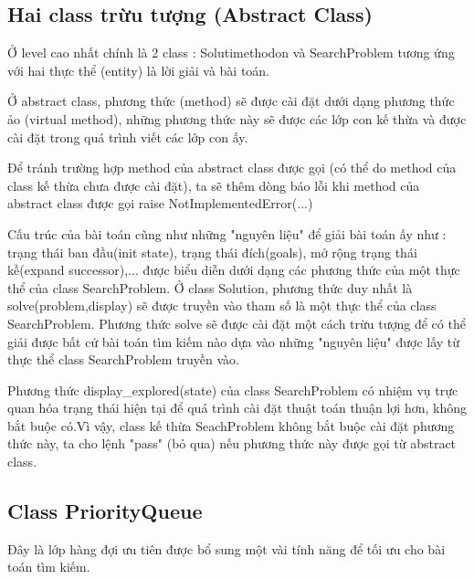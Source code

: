 \documentclass[11pt]{scrartcl} %
\begin{document}
\subsection{Hai class trừu tượng (Abstract Class)}
Ở level cao nhất chính là 2 class : Solutimethodon và SearchProblem tương ứng với hai thực thể (entity) là lời giải và bài toán.

Ở abstract class, phương thức (method) sẽ được cài đặt dưới dạng phương thức ảo (virtual method), những phương thức này sẽ được các lớp con kế thừa và được cài đặt trong quá trình viết các lớp con ấy.

Để tránh trường hợp method của abstract class được gọi (có thể do method của class kế thừa chưa được cài đặt), ta sẽ thêm dòng báo lỗi khi method của abstract class được gọi raise NotImplementedError(...)



Cấu trúc của bài toán cũng như những "nguyên liệu" để giải bài toán ấy như : trạng thái ban đầu(init state), trạng thái đích(goals), mở rộng trạng thái kề(expand successor)\cite{csttnt_lhb},... được biểu diễn dưới dạng các phương thức của một thực thể của class SearchProblem. Ở class Solution, phương thức duy nhất là solve(problem,display) sẽ được truyền vào tham số là một thực thể của class SearchProblem. Phương thức solve sẽ được cài đặt một cách trừu tượng để có thể giải được bất cứ bài toán tìm kiếm nào dựa vào những "nguyên liệu" được lấy từ thực thể class SearchProblem truyền vào.

Phương thức display\_explored(state) của class SearchProblem có nhiệm vụ trực quan hóa trạng thái hiện tại để quá trình cài đặt thuật toán thuận lợi hơn, không bắt buộc có.Vì vậy, class kế thừa SeachProblem không bắt buộc cài đặt phương thức này, ta cho lệnh "pass" (bỏ qua) nếu phương thức này được gọi từ abstract class.

\subsection{Class PriorityQueue}
Đây là lớp hàng đợi ưu tiên được bổ sung một vài tính năng để tối ưu cho bài toán tìm kiếm.
\end{document}
